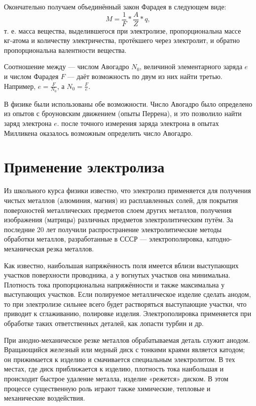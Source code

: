 \documentclass[a4paper,10pt]{book}
\begin{document}
Окончательно получаем объединённый закон Фарадея в следующем виде: \begin{equation}\label{22.5}
M = \frac{1}{F}*\frac{A}{Z}*q,
\end{equation} т. е. масса вещества, выделившегося при электролизе, пропорциональна массе $\textit{кг-атома}$ и количеству электричества, протёкшего через электролит, и обратно пропорциональна валентности вещества.

Соотношение между — числом Авогадро $N_0$, величиной элементарного заряда $e$ и числом Фарадея $F$ — даёт возможность по двум из них найти третью. Например, $e = \frac{F}{N_0}$, а $N_0 = \frac{F}{e}$.

В физике были использованы обе возможности. Число Авогадро было определено из опытов с броуновским движением (опыты Перрена), и это позволило найти заряд электрона $e$. после точного измерения заряда электрона в опытах Милликена оказалось возможным определить число Авогадро.

\section{Применение электролиза}

Из школьного курса физики известно, что электролиз применяется для получения чистых металлов (алюминия, магния) из расплавленных солей, для покрытия поверхностей металлических предметов слоем других металлов, получения изображения (матрицы) различных предметов электролитическим путём. За последние 20 лет получили распространение электролитические методы обработки металлов, разработанные в СССР — электрополировка, катодно-механическая резка металлов.

Как известно, наибольшая напряжённость поля имеется вблизи выступающих участков поверхности проводника, а у вогнутых участков она минимальна. Плотность тока пропорциональна напряжённости и также максимальна у выступающих участков. Если полируемое металлическое изделие сделать анодом, то при электролизе сильнее всего будет растворяться выступающие участки, что приводит к сглаживанию, полировке изделия. Электрополировка применяется при обработке таких ответственных деталей, как лопасти турбин и др.

При анодно-механическое резке металлов обрабатываемая деталь служит анодом. Вращающийся железный или медный диск с тонкими краями является катодом; он прижимается к изделию и смачивается специальным электролитом. В тех местах, где диск приближается к изделию, плотность тока наибольшая и происходит быстрое удаление металла, изделие «режется» диском. В этом процессе существенную роль играют также химические, тепловые и механические воздействия.
\end{document}
